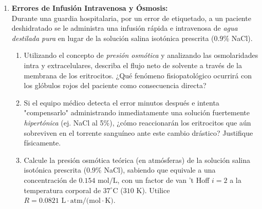 \documentclass[10pt,letterpaper]{article}
\begin{document}
\begin{enumerate}[leftmargin=*]
    \item \textbf{Errores de Infusión Intravenosa y Ósmosis:}\\
    Durante una guardia hospitalaria, por un error de etiquetado, a un paciente deshidratado se le administra una infusión rápida e intravenosa de \textit{agua destilada pura} en lugar de la solución salina isotónica prescrita ($0.9\%$ NaCl). 
    \begin{enumerate}
        \item Utilizando el concepto de \textit{presión osmótica} y analizando las osmolaridades intra y extracelulares, describa el flujo neto de solvente a través de la membrana de los eritrocitos. ¿Qué fenómeno fisiopatológico ocurrirá con los glóbulos rojos del paciente como consecuencia directa?
        \item Si el equipo médico detecta el error minutos después e intenta "compensarlo" administrando inmediatamente una solución fuertemente \textit{hipertónica} (ej. NaCl al 5\%), ¿cómo reaccionarán los eritrocitos que aún sobreviven en el torrente sanguíneo ante este cambio drástico? Justifique físicamente.
        \item Calcule la presión osmótica teórica (en atmósferas) de la solución salina isotónica prescrita ($0.9\%$ NaCl), sabiendo que equivale a una concentración de $0.154 \text{ mol/L}$, con un factor de van 't Hoff $i = 2$ a la temperatura corporal de $37^\circ\text{C}$ ($310 \text{ K}$). Utilice $R = 0.0821 \text{ L}\cdot\text{atm/(mol}\cdot\text{K)}$.
    \end{enumerate}

    \vspace{0.1cm}


\end{enumerate}
\end{document}
